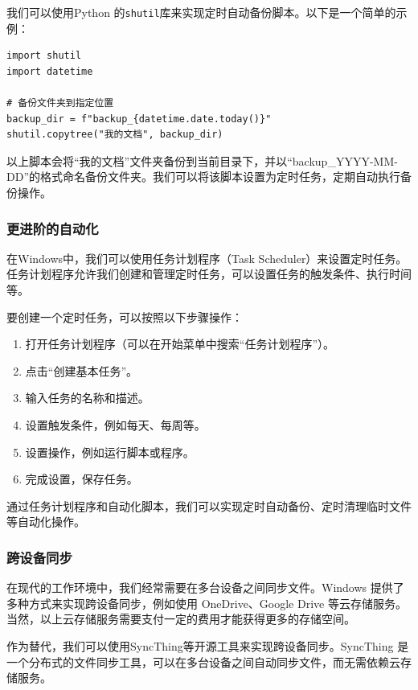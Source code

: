 \documentclass[../main.tex]{subfiles}
\begin{document}
我们可以使用Python 的\texttt{shutil}库来实现定时自动备份脚本。以下是一个简单的示例：
\begin{verbatim}
import shutil  
import datetime  

# 备份文件夹到指定位置  
backup_dir = f"backup_{datetime.date.today()}"  
shutil.copytree("我的文档", backup_dir)  
\end{verbatim}

以上脚本会将“我的文档”文件夹备份到当前目录下，并以“backup\_YYYY-MM-DD”的格式命名备份文件夹。我们可以将该脚本设置为定时任务，定期自动执行备份操作。

\subsubsection{更进阶的自动化}

在Windows中，我们可以使用任务计划程序（Task Scheduler）来设置定时任务。任务计划程序允许我们创建和管理定时任务，可以设置任务的触发条件、执行时间等。

要创建一个定时任务，可以按照以下步骤操作：
\begin{enumerate}
  \item 打开任务计划程序（可以在开始菜单中搜索“任务计划程序”）。
  \item 点击“创建基本任务”。
  \item 输入任务的名称和描述。
  \item 设置触发条件，例如每天、每周等。
  \item 设置操作，例如运行脚本或程序。
  \item 完成设置，保存任务。
\end{enumerate}

通过任务计划程序和自动化脚本，我们可以实现定时自动备份、定时清理临时文件等自动化操作。

\subsubsection{跨设备同步}

在现代的工作环境中，我们经常需要在多台设备之间同步文件。Windows 提供了多种方式来实现跨设备同步，例如使用 OneDrive、Google Drive 等云存储服务。当然，以上云存储服务需要支付一定的费用才能获得更多的存储空间。

作为替代，我们可以使用SyncThing等开源工具来实现跨设备同步。SyncThing 是一个分布式的文件同步工具，可以在多台设备之间自动同步文件，而无需依赖云存储服务。
\end{document}

